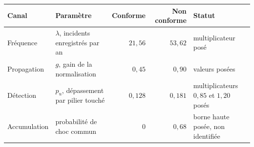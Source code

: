 \begin{center}\footnotesize
\renewcommand{\arraystretch}{1.2}
\begin{tabular}{@{}l l r r >{\raggedright\arraybackslash}p{4.6cm}@{}}
\toprule
\textbf{Canal} & \textbf{Paramètre} & \textbf{Conforme} & \textbf{Non conforme} & \textbf{Statut} \\
\midrule
Fréquence & $\lambda$, incidents enregistrés par an & $21{,}56$ & $53{,}62$ & multiplicateur posé \\
Propagation & $g$, gain de la normalisation & $0{,}45$ & $0{,}90$ & valeurs posées \\
Détection & $p_u$, dépassement par pilier touché & $0{,}128$ & $0{,}181$ & multiplicateurs $0{,}85$ et $1{,}20$ posés \\
Accumulation & probabilité de choc commun & $0$ & $0{,}68$ & borne haute posée, non identifiée \\
\bottomrule
\end{tabular}
\end{center}

